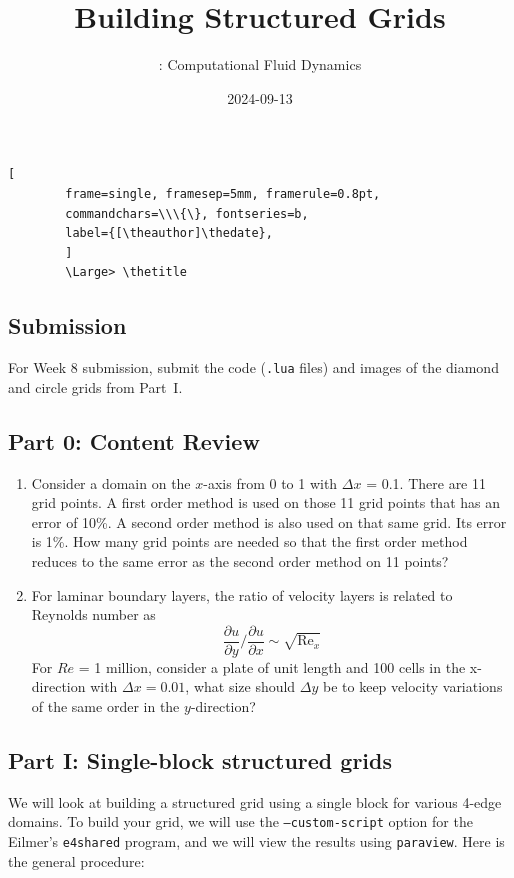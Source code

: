 \documentclass{article}
\title{Building Structured Grids}
\author{\course: Computational Fluid Dynamics}
\date{2024-09-13}
\begin{document}
	\begin{Verbatim}[
		frame=single, framesep=5mm, framerule=0.8pt,
		commandchars=\\\{\}, fontseries=b,
		label={[\theauthor]\thedate},
		]
		\Large> \thetitle
	\end{Verbatim}
	\bigskip
	
	\setcounter{solution}{1}
	\vspace*{-0.5cm}
\subsection*{Submission}
For Week 8 submission, submit the code (\texttt{.lua} files) and images of the diamond and circle grids from Part~I.
\subsection*{Part 0: Content Review} 
\begin{enumerate}
	\item 
 Consider a domain on the $x$-axis from 0 to 1 with $\Delta x$ = 0.1. There are 11 grid points. A first order method is used on those 11 grid points that has an error of 10\%. A second order method is also used on that same grid. Its error is 1\%. How many grid points are needed so that the first order method reduces to the same error as the second order method on 11 points?
	\item For laminar boundary layers, the ratio of velocity layers is related
		to Reynolds number as
		\[  \frac{\partial u}{\partial y} / \frac{\partial u}{\partial x} \sim \sqrt{\text{Re}_x} \]
        For $Re$ = 1 million, consider a plate of unit length and
        100 cells in the x-direction with $\Delta x = 0.01$, what size should $\Delta y$
        be to keep velocity variations of the same order in the $y$-direction?
\end{enumerate}

\subsection*{Part I: Single-block structured grids}

We will look at building a structured grid using a single block
for various 4-edge domains.
To build your grid, we will use the \texttt{--custom-script} option for
the Eilmer's \texttt{e4shared} program, and we will view the results using
\texttt{paraview}. Here is the general procedure:
\end{document}

